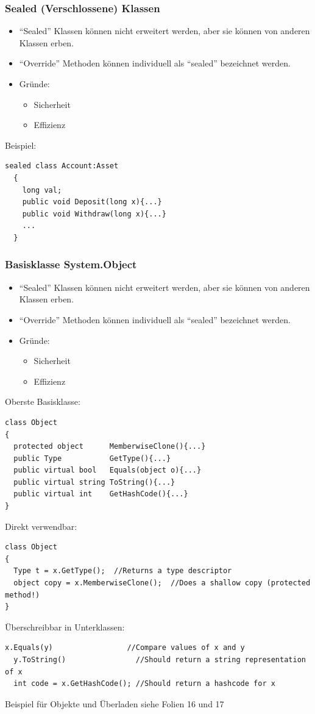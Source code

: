 \subsubsection{Sealed (Verschlossene) Klassen}
\begin{itemize}
  \item "`Sealed"' Klassen können nicht erweitert werden, aber sie können von
  anderen Klassen erben. 
  \item "`Override"' Methoden können individuell als "`sealed"' bezeichnet
  werden.
  \item Gründe:
  \begin{itemize}
    \item Sicherheit
    \item Effizienz
  \end{itemize}
\end{itemize}
Beispiel: 
\begin{lstlisting}[style=C]
  sealed class Account:Asset
  {
    long val; 
    public void Deposit(long x){...}
    public void Withdraw(long x){...}
    ...
  }
\end{lstlisting}

\subsubsection{Basisklasse System.Object}
\begin{itemize}
  \item "`Sealed"' Klassen können nicht erweitert werden, aber sie können von
  anderen Klassen erben. 
  \item "`Override"' Methoden können individuell als "`sealed"' bezeichnet
  werden.
  \item Gründe:
  \begin{itemize}
    \item Sicherheit
    \item Effizienz
  \end{itemize}
\end{itemize}
Oberste Basisklasse:
\begin{lstlisting}[style=C]
class Object
{
  protected object      MemberwiseClone(){...}
  public Type           GetType(){...}
  public virtual bool   Equals(object o){...}
  public virtual string ToString(){...}
  public virtual int    GetHashCode(){...}
}
\end{lstlisting}
Direkt verwendbar: 
\begin{lstlisting}[style=C]
class Object
{
  Type t = x.GetType();  //Returns a type descriptor
  object copy = x.MemberwiseClone();  //Does a shallow copy (protected method!)
}
\end{lstlisting}
Überschreibbar in Unterklassen: 
\begin{lstlisting}[style=C]
  x.Equals(y)                 //Compare values of x and y
  y.ToString()                //Should return a string representation of x
  int code = x.GetHashCode(); //Should return a hashcode for x
\end{lstlisting}

Beispiel für Objekte und Überladen siehe Folien 16 und 17